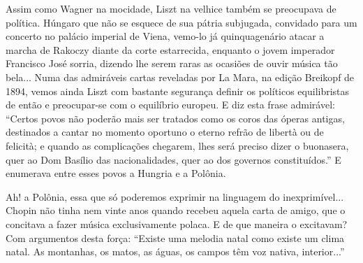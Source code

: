 Assim como Wagner na mocidade, Liszt na velhice também se preocupava de
política. Húngaro que não se esquece de sua pátria subjugada, convidado
para um concerto no palácio imperial de Viena, vemo-lo já quinquagenário
atacar a marcha de Rakoczy diante da corte estarrecida, enquanto o jovem
imperador Francisco José sorria, dizendo lhe serem raras as ocasiões de
ouvir música tão bela... Numa das admiráveis cartas reveladas por La
Mara, na edição Breikopf de 1894, vemos ainda Liszt com bastante
segurança definir os políticos equilibristas de então e preocupar-se com
o equilíbrio europeu. E diz esta frase admirável: ``Certos povos não
poderão mais ser tratados como os coros das óperas antigas, destinados a
cantar no momento oportuno o eterno refrão de libertà ou de felicità; e
quando as complicações chegarem, lhes será preciso dizer o buonasera,
quer ao Dom Basílio das nacionalidades, quer ao dos governos
constituídos.'' E enumerava entre esses povos a Hungria e a Polônia.

Ah! a Polônia, essa que só poderemos exprimir na linguagem do
inexprimível... Chopin não tinha nem vinte anos quando recebeu aquela
carta de amigo, que o concitava a fazer música exclusivamente polaca. E
de que maneira o excitavam? Com argumentos desta força: ``Existe uma
melodia natal como existe um clima natal. As montanhas, os matos, as
águas, os campos têm voz nativa, interior...''

